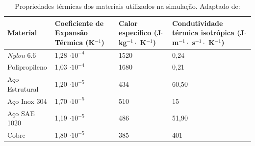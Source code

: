 \begin{table}[H]
    \centering
    \caption{Propriedades térmicas dos materiais utilizados na simulação. Adaptado de: \cite{materiais}}
    \label{tab:Propriedadestermicas}
    \begin{adjustbox}{max width = \textwidth}
        \begin{tabular}{|C{3.5cm}|C{4cm}|C{3.5cm}|C{4cm}|}
            \hline
            \textbf{Material} & \textbf{Coeficiente de Expansão Térmica \qquad  (K$^{-1}$)} & \textbf{Calor específico (J$\cdot$ kg$^{-1}\cdot$ K$^{-1}$)} & \textbf{Condutividade térmica isotrópica (J$\cdot$m$^{-1}\cdot$ s$^{-1}\cdot$ K$^{-1}$)} \\ \hline
              \textit{Nylon} 6.6 & 1,28 $\cdot10^{-4} $ & 1520 & 0,24 \\ \hline
              Polipropileno & 1,03 $\cdot10^{-4} $ & 1680 & 0,21 \\ \hline
              Aço Estrutural  & 1,20 $\cdot10^{-5} $ & 434 & 60,50 \\ \hline
              Aço Inox 304  & 1,70 $\cdot10^{-5} $ & 510 & 15 \\ \hline
              Aço SAE 1020  & 1,19 $\cdot10^{-5}$ & 486 & 51,90 \\ \hline
              Cobre  & 1,80 $\cdot10^{-5} $ & 385 & 401 \\\hline
             
        \end{tabular}
    \end{adjustbox}
\end{table}


